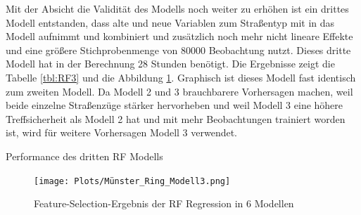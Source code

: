 \documentclass[a4paper,12pt]{thesis}
\begin{document}
Mit der Absicht die Validität des Modells noch weiter zu erhöhen ist ein drittes Modell entstanden, dass alte und neue Variablen zum  Straßentyp mit in das Modell aufnimmt und kombiniert und zusätzlich noch mehr nicht lineare Effekte und eine größere Stichprobenmenge von 80000 Beobachtung nutzt. Dieses dritte Modell hat in der Berechnung 28 Stunden benötigt. Die Ergebnisse zeigt die Tabelle \ref{tbl:RF3} und die Abbildung \ref{Munster}. Graphisch ist dieses Modell fast identisch zum zweiten Modell. Da Modell 2 und 3 brauchbarere Vorhersagen machen, weil beide einzelne Straßenzüge stärker hervorheben und weil Modell 3 eine höhere Treffsicherheit als Modell 2 hat und mit mehr Beobachtungen trainiert worden ist, wird für weitere Vorhersagen Modell 3 verwendet.

\begin{table}
	\caption{Performance des dritten RF Modells}
	\label{tbl:RF3}
\end{table}

\begin{figure}[!ht]
	\centering
	\texttt{[image: Plots/Münster\_Ring\_Modell3.png]}
	\caption{Feature-Selection-Ergebnis der RF Regression in 6 Modellen}
	\label{Munster}
\end{figure}
\end{document}

